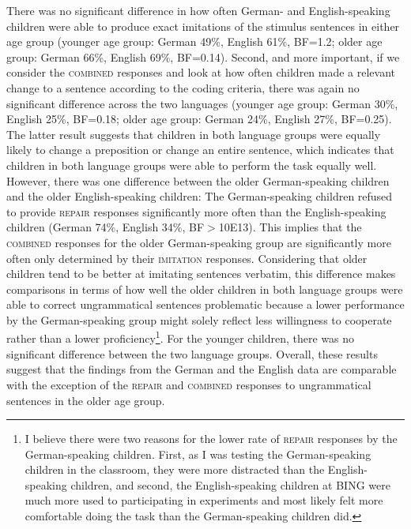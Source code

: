 \documentclass[lucida]{sp} %
\begin{document}
There was no significant difference in how often German- and English-speaking children were able to produce exact imitations of the stimulus sentences in either age group (younger age group: German 49\%, English 61\%, BF=1.2; older age group: German 66\%, English 69\%, BF=0.14). %
Second, and more important, if we consider the \textsc{combined} responses and look at how often children made a relevant change to a sentence according to the coding criteria, there was again no significant difference across the two languages (younger age group: German 30\%, English 25\%, BF=0.18; older age group: German 24\%, 
English 27\%, BF=0.25). %
The latter result suggests that children in both language groups were equally likely to change a preposition or change an entire sentence, which indicates that children in both language groups were able to perform the task equally well. However, there was one difference between the older German-speaking children and the older English-speaking children: The German-speaking children refused to provide \textsc{repair} responses significantly more often than the English-speaking children (German 74\%, English 34\%, BF$>$10E13). This implies that the \textsc{combined} responses for the older German-speaking group are significantly more often only determined by their \textsc{imitation} responses. Considering that older children tend to be better at imitating sentences verbatim, this difference makes comparisons in terms of how well the older children in both language groups were able to correct ungrammatical sentences  problematic because a lower performance by the German-speaking group might solely reflect less willingness to cooperate rather than a lower proficiency\footnote{I believe there were two reasons for the lower rate of \textsc{repair} responses by the German-speaking children. First, as I was testing the German-speaking children in the classroom, they were more distracted than the English-speaking children, and second, the English-speaking children at BING were much more used to participating in experiments and most likely felt more comfortable doing the task than the German-speaking children did.}. For the younger children, there was no significant difference between the two language groups. Overall,  these results suggest that the findings from the German and the English data are comparable with the exception of the \textsc{repair} and \textsc{combined} responses to ungrammatical sentences in the older age group.
\end{document}
